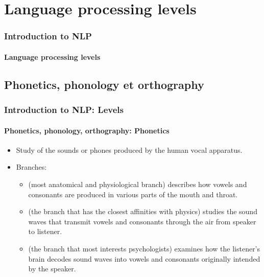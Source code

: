 \documentclass[xcolor=table]{beamer}
\begin{document}
\section{Language processing levels}

\begin{frame}
\frametitle{Introduction to NLP}
\framesubtitle{Language processing levels}

\begin{center}
\end{center}

\end{frame}

\subsection{Phonetics, phonology et orthography}

\begin{frame}
\frametitle{Introduction to NLP: Levels}
\framesubtitle{Phonetics, phonology, orthography: Phonetics}

\begin{itemize}
	\item Study of the sounds or phones produced by the human vocal apparatus.
	\item Branches:
	\begin{itemize}
		\item {} (most anatomical and physiological branch) describes how vowels and consonants are produced in various parts of the mouth and throat.
		\item {} (the branch that has the closest affinities with physics) studies the sound waves that transmit vowels and consonants through the air from speaker to listener.
		\item {} (the branch that most interests psychologists) examines how the listener's brain decodes sound waves into vowels and consonants originally intended by the speaker.
	\end{itemize}
\end{itemize}

\end{frame}
\end{document}
